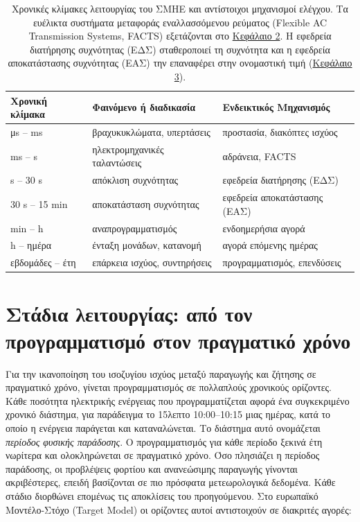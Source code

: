\begin{table}[!htbp]
\centering
\begin{tabular}{lll}
\hline
Χρονική κλίμακα & Φαινόμενο ή διαδικασία & Ενδεικτικός Μηχανισμός \\
\hline
μs -- ms   & βραχυκυκλώματα, υπερτάσεις   & προστασία, διακόπτες ισχύος \\
ms -- s    & ηλεκτρομηχανικές ταλαντώσεις & αδράνεια, FACTS \\
s -- 30 s  & απόκλιση συχνότητας          & εφεδρεία διατήρησης (ΕΔΣ) \\
30 s -- 15 min & αποκατάσταση συχνότητας  & εφεδρεία αποκατάστασης (ΕΑΣ) \\
min -- h   & αναπρογραμματισμός           & ενδοημερήσια αγορά \\
h -- ημέρα & ένταξη μονάδων, κατανομή     & αγορά επόμενης ημέρας \\
εβδομάδες -- έτη & επάρκεια ισχύος, συντηρήσεις & προγραμματισμός, επενδύσεις \\
\hline
\end{tabular}
\caption{Χρονικές κλίμακες λειτουργίας του ΣΜΗΕ και αντίστοιχοι μηχανισμοί ελέγχου. Τα ευέλικτα
συστήματα μεταφοράς εναλλασσόμενου ρεύματος (Flexible AC Transmission Systems, FACTS)
εξετάζονται στο \hyperref[kef-02-theoria]{Κεφάλαιο 2}. Η εφεδρεία
διατήρησης συχνότητας (ΕΔΣ) σταθεροποιεί τη συχνότητα και η εφεδρεία αποκατάστασης συχνότητας
(ΕΑΣ) την επαναφέρει στην ονομαστική τιμή (\hyperref[kef-03-theoria]{Κεφάλαιο 3}).}
\label{tab:chronikes-klimakes}
\end{table}

\section{Στάδια λειτουργίας: από τον προγραμματισμό στον πραγματικό χρόνο}
\label{sec:stages}

Για την ικανοποίηση του ισοζυγίου ισχύος μεταξύ παραγωγής και ζήτησης σε πραγματικό χρόνο, γίνεται προγραμματισμός σε πολλαπλούς χρονικούς ορίζοντες. Κάθε ποσότητα ηλεκτρικής ενέργειας που προγραμματίζεται αφορά ένα συγκεκριμένο χρονικό
διάστημα, για παράδειγμα το 15λεπτο 10:00--10:15 μιας ημέρας, κατά το οποίο η ενέργεια παράγεται και καταναλώνεται. Το διάστημα αυτό ονομάζεται \emph{περίοδος φυσικής παράδοσης}. Ο προγραμματισμός για κάθε περίοδο ξεκινά έτη νωρίτερα και ολοκληρώνεται σε πραγματικό χρόνο. Όσο πλησιάζει η περίοδος παράδοσης, οι προβλέψεις φορτίου και ανανεώσιμης παραγωγής γίνονται ακριβέστερες, επειδή βασίζονται σε πιο πρόσφατα
μετεωρολογικά δεδομένα. Κάθε στάδιο διορθώνει επομένως τις αποκλίσεις του προηγούμενου. Στο ευρωπαϊκό
Μοντέλο-Στόχο (Target Model) οι ορίζοντες αυτοί αντιστοιχούν σε διακριτές αγορές:

